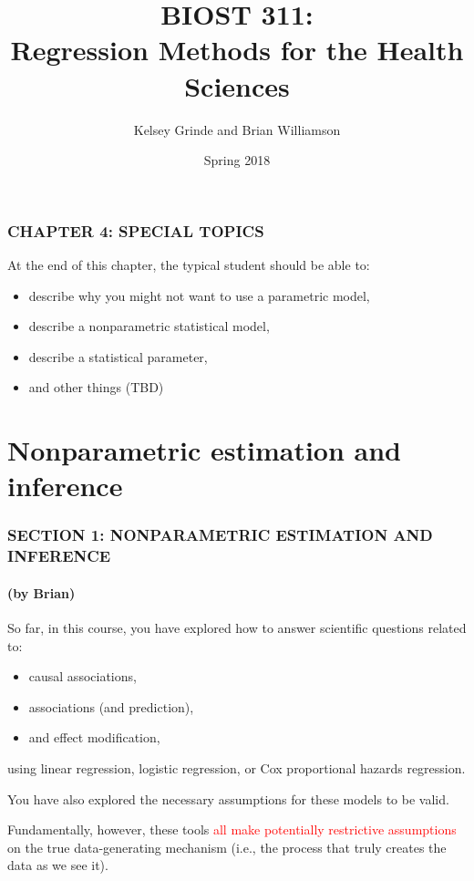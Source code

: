 \documentclass[12pt, 
hyperref={colorlinks=true, linkcolor=blue, urlcolor=cyan},dvipsnames]{beamer}
\title{BIOST 311: \\ Regression Methods for the Health Sciences}
\author{Kelsey Grinde and Brian Williamson}
\institute{UW Biostatistics}
\date{Spring 2018}
\begin{document}
\begin{frame}
\titlepage\thispagestyle{empty}
\end{frame}

  
\setcounter{framenumber}{\value{chap4}}

\begin{frame}
\frametitle{CHAPTER 4: SPECIAL TOPICS}
At the end of this chapter, the typical student should be able to:
\begin{itemize}
\item describe why you might not want to use a parametric model,
\item describe a nonparametric statistical model,
\item describe a statistical parameter, 
\item and other things (TBD)
\end{itemize}
\end{frame}

\section{Nonparametric estimation and inference}
\begin{frame}
\frametitle{SECTION 1: {\small NONPARAMETRIC ESTIMATION AND INFERENCE}}
\framesubtitle{(by Brian)}

So far, in this course, you have explored how to answer scientific questions related to: \vspace{-0.3cm}
\begin{itemize}
\item causal associations,
\item associations (and prediction),
\item and effect modification,
\end{itemize} \vspace{-0.3cm}
using linear regression, logistic regression, or Cox proportional hazards regression.

You have also explored the necessary assumptions for these models to be valid.

Fundamentally, however, these tools \textcolor{red}{all make potentially restrictive assumptions} on the true data-generating mechanism (i.e., the process that truly creates the data as we see it).
\end{frame}
\end{document}
